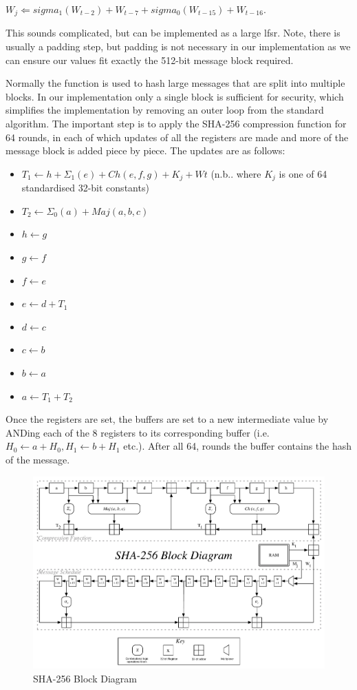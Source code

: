 $W_{j} \Leftarrow sigma_{1}(W_{t-2} )+ W_{t-7}  + sigma_{0}(W_{t-15}) + W_{t-16}$.

This sounds complicated, but can be implemented as a large \gls{lfsr}.
Note, there is usually a padding step, but padding is not necessary in our
implementation as we can ensure our values fit exactly the
512-bit message block required.

Normally the function is used to hash large messages that are split into
multiple blocks. In our implementation only a single block is sufficient for
security, which simplifies the implementation by removing an outer loop from the
standard algorithm.
The important step is to apply the SHA-256 compression function for 64 rounds,
in each of which updates of all the registers are made and more of the message
block is added piece by piece. The updates are as follows:

\begin{itemize}
	\item $T_{1} \leftarrow h + \Sigma_{1}(e) + Ch(e,f,g) + K_{j}  + W{t}$ (n.b.. where $K_{j}$ is one of 64 standardised 32-bit constants)

	\item $T_{2} \leftarrow \Sigma_{0}(a) + Maj(a,b,c)$
	\item $h     \leftarrow g$
	\item $g     \leftarrow f$
	\item $f     \leftarrow e$
	\item $e     \leftarrow d + T_{1}$
	\item $d     \leftarrow c$
	\item $c     \leftarrow b$
	\item $b     \leftarrow a$
	\item $a     \leftarrow T_{1} + T_{2}$
\end{itemize}

Once the registers are set, the buffers are set to a new intermediate value by
ANDing each of the 8 registers to its corresponding buffer
(i.e. $H_{0} \leftarrow a + H_{0}, H_{1} \leftarrow b + H_{1}$ etc.).
After all 64, rounds the buffer contains the hash of the message.

\begin{figure}
  \centering
  \includegraphics[angle=270, scale=0.7]{images/sha256}
  \caption{SHA-256 Block Diagram}
  \label{fig:sha256}
\end{figure}

